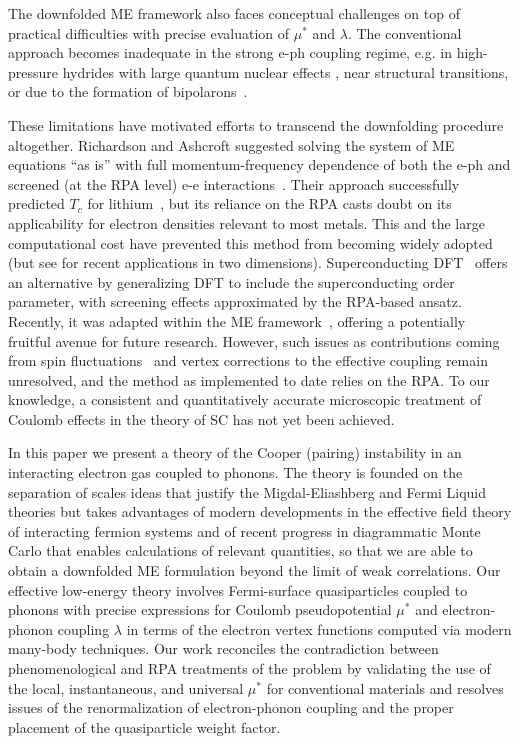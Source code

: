\documentclass[%
 reprint,
superscriptaddress,
 amsmath,amssymb,
 aps,
prx,
]{revtex4-2}
\begin{document}
The downfolded ME framework also faces conceptual challenges on top of practical difficulties with precise evaluation of $\mu^*$ and $\lambda$. The conventional approach becomes inadequate in the strong e-ph coupling regime, e.g. in high-pressure hydrides with large quantum nuclear effects \cite{kostrzewa_anomalously_2018}, 
near structural transitions, or due to the formation of bipolarons~\cite{bipolaron1,bipolaron2,bipolaron3}. 

These limitations have motivated efforts to transcend the downfolding procedure altogether. Richardson and Ashcroft suggested solving the system of ME equations ``as is'' with full momentum-frequency dependence of both the e-ph and screened (at the RPA level)  e-e interactions~\cite{ashcroft1, ashcroft2}.  Their approach successfully predicted $T_c$ for lithium~\cite{tuoriniemi_superconductivity_2007}, but its reliance on the RPA casts doubt on its applicability for electron densities relevant to most metals. This and the large computational cost have 
prevented this method from becoming widely adopted {(but see \cite{veld23} for recent applications in two dimensions)}.
Superconducting DFT~\cite{SCDFT1,SCDFT2,profeta_superconductivity_2006} offers an alternative by generalizing DFT to include the superconducting order parameter, with screening effects approximated by the RPA-based ansatz. Recently, it was adapted within the ME framework~\cite{scdft-eliashberg}, offering a potentially fruitful avenue for future research.  However, such issues as contributions coming from spin fluctuations~\cite{kawamura_benchmark_2020} and vertex corrections to the effective coupling remain unresolved, {and the method as implemented to date relies on the RPA.  To our knowledge, a consistent and quantitatively accurate microscopic treatment of Coulomb effects in the theory of SC has not yet been achieved.}


In this paper we present a theory of the Cooper (pairing) instability in an interacting electron gas coupled to phonons. The theory is founded on the separation of scales ideas that justify the Migdal-Eliashberg and Fermi Liquid theories but takes advantages of modern developments in the effective field theory of interacting fermion systems and of recent progress in diagrammatic Monte Carlo that enables calculations of relevant quantities, so that we are able to obtain a downfolded ME formulation beyond the limit of weak correlations. Our effective low-energy theory involves Fermi-surface quasiparticles coupled to phonons with precise expressions for Coulomb pseudopotential $\mu^*$ and electron-phonon coupling $\lambda$  in terms of the electron vertex functions computed via modern many-body techniques. Our work reconciles the contradiction between phenomenological and RPA treatments of the problem  by validating the use of the local, instantaneous, and universal $\mu^*$ for conventional materials and resolves issues of the renormalization of  electron-phonon coupling and the proper placement of the quasiparticle weight factor.
\end{document}
